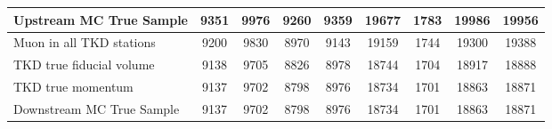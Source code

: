 \begin{landscape}
\begin{table}
\begin{tabular}[pos]{l|cccccccc}
\hline                                            
Upstream MC True Sample                            &    9351  &    9976  &    9260  &    9359  &   19677  &    1783  &   19986  &   19956  \\
\hline                                            
Muon in all TKD stations                           &    9200  &    9830  &    8970  &    9143  &   19159  &    1744  &   19300  &   19388  \\
TKD true fiducial volume                           &    9138  &    9705  &    8826  &    8978  &   18744  &    1704  &   18917  &   18888  \\
TKD true momentum                                  &    9137  &    9702  &    8798  &    8976  &   18734  &    1701  &   18863  &   18871  \\
\hline                                            
Downstream MC True Sample                          &    9137  &    9702  &    8798  &    8976  &   18734  &    1701  &   18863  &   18871  \\
\hline                                            

\end{tabular}
\end{table}
\end{landscape}


